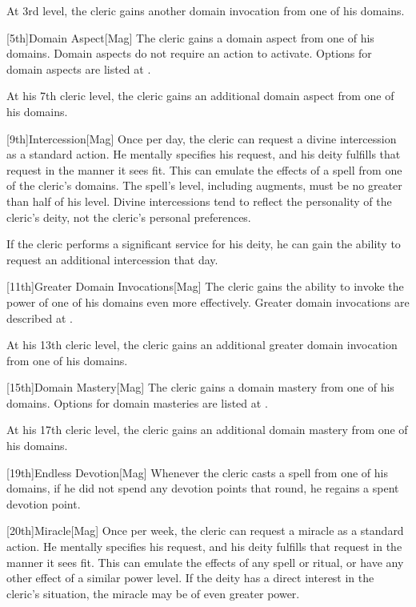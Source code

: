         At 3rd level, the cleric gains another domain invocation from one of his domains.

        [5th]{Domain Aspect}[Mag]
        The cleric gains a domain aspect from one of his domains.
        Domain aspects do not require an action to activate.
        Options for domain aspects are listed at .

        At his 7th cleric level, the cleric gains an additional domain aspect from one of his domains.

        [9th]{Intercession}[Mag]
        Once per day, the cleric can request a divine intercession as a standard action.
        He mentally specifies his request, and his deity fulfills that request in the manner it sees fit.
        This can emulate the effects of a spell from one of the cleric's domains.
        The spell's level, including augments, must be no greater than half of his level.
        Divine intercessions tend to reflect the personality of the cleric's deity, not the cleric's personal preferences.

        If the cleric performs a significant service for his deity, he can gain the ability to request an additional intercession that day.

        [11th]{Greater Domain Invocations}[Mag]
        The cleric gains the ability to invoke the power of one of his domains even more effectively.
        Greater domain invocations are described at .

        At his 13th cleric level, the cleric gains an additional greater domain invocation from one of his domains.

        [15th]{Domain Mastery}[Mag]
        The cleric gains a domain mastery from one of his domains.
        Options for domain masteries are listed at .

        At his 17th cleric level, the cleric gains an additional domain mastery from one of his domains.

        [19th]{Endless Devotion}[Mag]
        Whenever the cleric casts a spell from one of his domains, if he did not spend any devotion points that round, he regains a spent devotion point.

        [20th]{Miracle}[Mag]
        Once per week, the cleric can request a miracle as a standard action.
        He mentally specifies his request, and his deity fulfills that request in the manner it sees fit.
        This can emulate the effects of any spell or ritual, or have any other effect of a similar power level.
        If the deity has a direct interest in the cleric's situation, the miracle may be of even greater power.

